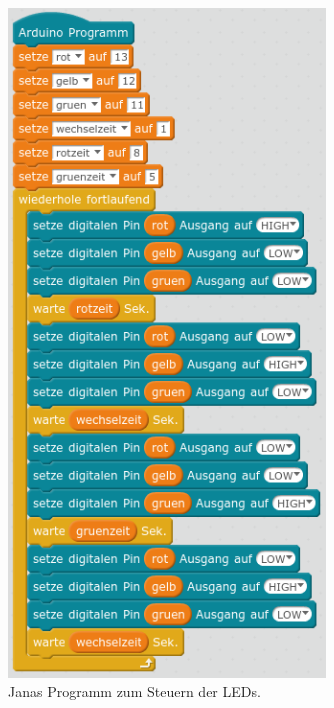 \begin{figure}[H]
\begin{minipage}{0.48\textwidth}
		\includegraphics[width=0.75\textwidth]{pics/ampel-mit-variablen.png}
		\caption{Janas Programm zum Steuern der LEDs.}
	\end{minipage}
\end{figure}
\vspace{-0.75\baselineskip}

